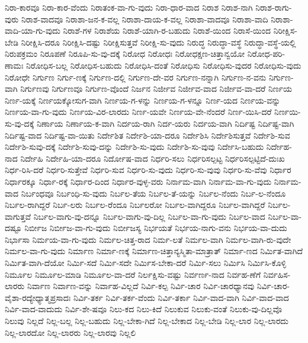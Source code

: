 {ನಿರಾ-ಕಾರವೂ
ನಿರಾ-ಕಾರ-ವೆಂದು
ನಿರಾತಂಕ-ವಾ-ಗು-ವುದು
ನಿರಾ-ಧಾರ-ವಾದ
ನಿರಾಶ
ನಿರಾಶ-ನಾಗಿ
ನಿರಾಶ-ರಾಗು-ವುರು
ನಿರಾಶ-ವಾದವೂ
ನಿರಾಶಾ-ಜನ-ಕ-ವಲ್ಲ
ನಿರಾಶಾ-ದಾಯ-ಕ-ವಲ್ಲ
ನಿರಾಶಾ-ವಾದವೂ
ನಿರಾಶಾ-ವಾದಿ
ನಿರಾಶಾ-ವಾದಿ-ಯಾ-ಗು-ವುದು
ನಿರಾಶೆ-ಗಳ
ನಿರಾಶೆಯ
ನಿರಾಶೆ-ಯಾಗಿ-ರ-ಬಹುದು
ನಿರಾಶೆ-ಯಿಂದ
ನಿರಾಸೆ-ಯಿಂದ
ನಿರೀಕ್ಷಿಸ-ಬೇಡಿ
ನಿರೀಕ್ಷಿಸಿ-ದರೂ
ನಿರೀಕ್ಷಿಸಿ-ದಷ್ಟು
ನಿರೀಕ್ಷಿಸುತ್ತವೆ
ನಿರೀಕ್ಷಿ-ಸು-ವುದು
ನಿರುದ್ಧ
ನಿರುದ್ಧಾ-ವಸ್ಥೆ
ನಿರುದ್ಧಾ-ವಸ್ಥೆ-ಯಲ್ಲಿ
ನಿರುಪಕ್ರಮಂ
ನಿರೂಪಣೆ
ನಿರೂಪಿ-ಸು-ವು-ದಕ್ಕೆ
ನಿರೋಧ
ನಿರೋಧಃ
ನಿರೋಧಕ್ಷಣ-ಚಿತ್ತಾನ್ವಯೋ
ನಿರೋಧ-ಪರಿ-ಣಾಮಃ
ನಿರೋಧಿಸ-ಬಲ್ಲ
ನಿರೋಧಿಸ-ಬಹುದು
ನಿರೋಧಿಸಿ-ದಂತೆ
ನಿರೋಧಿಸು
ನಿರೋಧಿಸು-ವುದರ
ನಿರೋಧಿಸು-ವುದು
ನಿರೋಧೇ
ನಿರ್ಗುಣ
ನಿರ್ಗು-ಣಕ್ಕೆ
ನಿರ್ಗುಣ-ದಲ್ಲಿ
ನಿರ್ಗುಣ-ದೇ-ವರ
ನಿರ್ಗುಣ-ನನ್ನಾಗಿ
ನಿರ್ಗುಣ-ನ-ವನು
ನಿರ್ಗುಣ-ವಾಗಿ
ನಿರ್ಗುಣವು
ನಿರ್ಗುಣವೂ
ನಿರ್ಗುಣ-ವೊಂದೆ
ನಿರ್ಜನ
ನಿರ್ಜೀವ
ನಿರ್ಜೀವ-ವಾದ
ನಿರ್ಜೀವ-ವಾ-ದರೆ
ನಿರ್ಣಯ
ನಿರ್ಣ-ಯಕ್ಕೆ
ನಿರ್ಣಯಕ್ಕೋಸುಗ-ವಾಗಿ
ನಿರ್ಣಯ-ಗ-ಳನ್ನು
ನಿರ್ಣಯ-ಗ-ಳನ್ನೂ
ನಿರ್ಣ-ಯದ
ನಿರ್ಣಯ-ವನ್ನು
ನಿರ್ಣಯ-ವಾ-ಗು-ವುದು
ನಿರ್ಣಯ-ವಿರ-ಲಾರದು
ನಿರ್ಣ-ಯವೇ
ನಿರ್ಣಯ-ವೇ-ನೆಂದರೆ
ನಿರ್ಣ-ಯಿಸಿ-ದರೆ
ನಿರ್ಣಯಿ-ಸು-ವು-ದಕ್ಕೆ
ನಿರ್ಣಾಯ
ನಿರ್ಣಾಯ-ಕ-ವಾಗಿ
ನಿರ್ದಯ-ರಾಗಿ
ನಿರ್ದ-ಯರು
ನಿರ್ದಯ-ವಾಗಿ
ನಿರ್ದಿಷ್ಟ
ನಿರ್ದಿಷ್ಟ-ವಾಗಿ
ನಿರ್ದಿಷ್ಟ-ವಾದ
ನಿರ್ದಿಷ್ಟ-ವಾ-ಯಿತು
ನಿರ್ದೇಶಿತ
ನಿರ್ದೇಶಿ-ಯಾ-ದರೂ
ನಿರ್ದೇಶಿಸಿ
ನಿರ್ದೇಶಿಸುತ್ತವೆ
ನಿರ್ದೇಶಿ-ಸುವ
ನಿರ್ದೇಶಿ-ಸುವು-ದಕ್ಕೆ
ನಿರ್ದೇಶಿ-ಸುವು-ದನ್ನು
ನಿರ್ದೇಶಿ-ಸು-ವುದು
ನಿರ್ದೇಶಿ-ಸು-ವುವು
ನಿರ್ದೇಸಿ-ಬಹುದು
ನಿರ್ದೇಹ-ನಾದ
ನಿರ್ದೇಹಿ
ನಿರ್ದೇಹಿ-ಯಾ-ದರೂ
ನಿರ್ದೋಷ-ವಾದ
ನಿರ್ಧರಿ-ಸಲು
ನಿರ್ಧರಿಸಲ್ಪಟ್ಟ
ನಿರ್ಧರಿಸಲ್ಪಟ್ಟಿದೆ-ದುಃಖ
ನಿರ್ಧ-ರಿಸಿ-ದರೆ
ನಿರ್ಧರಿ-ಸುತ್ತೇವೆ
ನಿರ್ಧರಿ-ಸುವ
ನಿರ್ಧರಿ-ಸು-ವುದು
ನಿರ್ಧರಿ-ಸು-ವುವು
ನಿರ್ಧರಿ-ಸು-ವೆವು
ನಿರ್ಧಾರ
ನಿರ್ಧಾರಕ್ಕೂ
ನಿರ್ಧಾ-ರಕ್ಕೆ
ನಿರ್ಧಾರ-ದಿಂದ
ನಿರ್ಧಾರ-ವುಳ್ಳ-ವರು
ನಿರ್ನಾಮ-ವಾಗಿ
ನಿರ್ನಾಮ-ವಾ-ಗು-ವುದು
ನಿರ್ನಾಮ-ವಾದ
ನಿರ್ಬಂಧವೂ
ನಿರ್ಬಂಧಿ-ಸು-ವುದು
ನಿರ್ಬಲ-ತೆಯ
ನಿರ್ಬಲ-ತೆ-ಯನ್ನು
ನಿರ್ಬಲ-ನೆಂದು
ನಿರ್ಬ-ಲ-ನೆಂದೂ
ನಿರ್ಬಲ-ರಾಗಿದ್ದರೆ
ನಿರ್ಬ-ಲರು
ನಿರ್ಬಲ-ರೆಂದೂ
ನಿರ್ಬಲರೋ
ನಿರ್ಬಲ-ವಾಗಿದ್ದರೂ
ನಿರ್ಬಲ-ವಾಗಿದ್ದರೆ
ನಿರ್ಬಲ-ವಾಗುತ್ತವೆ
ನಿರ್ಬಲ-ವಾಗು-ವು-ದನ್ನೂ
ನಿರ್ಬಲ-ವಾಗು-ವು-ದಿಲ್ಲ
ನಿರ್ಬಲ-ವಾ-ಗು-ವುದು
ನಿರ್ಬಲ-ವಾದ
ನಿರ್ಬಲ-ವಾ-ದಷ್ಟೂ
ನಿರ್ಬೀಜ
ನಿರ್ಬೀಜ-ವಾ-ಗು-ವುದು
ನಿರ್ಬೀಜಸ್ಯ
ನಿರ್ಭಯತೆ
ನಿರ್ಭಯ-ನಾಗು-ವನು
ನಿರ್ಭಯ-ವಾ-ದುದು
ನಿರ್ಭಾಸಾ
ನಿರ್ಮಯ-ವಾ-ಗು-ವುದು
ನಿರ್ಮಲ-ಚಿತ್ತ-ರಾದ
ನಿರ್ಮ-ಲತೆ
ನಿರ್ಮಲ-ವಾಗಿ
ನಿರ್ಮಲ-ವಾಗಿ-ರು-ವುದೇ
ನಿರ್ಮಲ-ವಾ-ಗು-ವುದು
ನಿರ್ಮಾಣ
ನಿರ್ಮಾ-ಣಕ್ಕೆ
ನಿರ್ಮಾಣ-ಚಿತ್ತಾನ್ಯಸ್ಮಿತಾ-ಮಾತ್ರಾತ್
ನಿರ್ಮಾ-ಣದ
ನಿರ್ಮಿತ-ವಾಗಿದೆ
ನಿರ್ಮಿತ-ವಾಗಿ-ದೆಯೋ
ನಿರ್ಮಿ-ಸದೆ
ನಿರ್ಮಿ-ಸದೇ
ನಿರ್ಮಿಸ-ಬೇಕಾ-ದರೆ
ನಿರ್ಮಿ-ಸಲು
ನಿರ್ಮಿಸಿ
ನಿರ್ಮಿಸಿ-ಕೊಳ್ಳಿ
ನಿರ್ಮೂಲ
ನಿರ್ಮೂಲ-ಮಾಡಿ
ನಿರ್ಮೂಲ-ವಾ-ದರೆ
ನಿರ್ಲಕ್ಷಿಸು-ವಷ್ಟು
ನಿರ್ವರ್ಣ-ನಾದ
ನಿರ್ವಹ-ಣೆಗೆ
ನಿರ್ವಹಿಸ-ಲಾರರು
ನಿರ್ವಾಣ
ನಿರ್ವಾಣ-ವನ್ನು
ನಿರ್ವಾಹ-ವಿಲ್ಲದೆ
ನಿರ್ವಿ-ಕಲ್ಪ
ನಿರ್ವಿ-ಚಾರ
ನಿರ್ವಿ-ಚಾರಧ್ಯಾನವು
ನಿರ್ವಿ-ಚಾರ-ವೈಶಾ-ರದ್ಯೇಧ್ಯಾತ್ಮಪ್ರಸಾದಃ
ನಿರ್ವಿ-ತರ್ಕ
ನಿರ್ವಿ-ತರ್ಕ-ವೆಂದು
ನಿರ್ವಿ-ತರ್ಕಾ
ನಿರ್ವಿ-ವಾದ-ವಾಗಿ
ನಿರ್ವಿ-ವಾದ-ವಾದ
ನಿರ್ವಿ-ವಾದ-ವಾದುದು
ನಿರ್ವಿ-ಶೇ-ಷವೂ
ನಿಲು-ಕದ
ನಿಲು-ಕಿದೆ
ನಿಲುಕುವ
ನಿಲುಕು-ವಂತೆ
ನಿಲುಕು-ವು-ದಿಲ್ಲವೊ
ನಿಲುವು
ನಿಲ್ಲದೆ
ನಿಲ್ಲ-ಬಲ್ಲ
ನಿಲ್ಲ-ಬಹುದು
ನಿಲ್ಲ-ಬೇಕಾ-ಗಿದೆ
ನಿಲ್ಲ-ಬೇಕಾದ
ನಿಲ್ಲ-ಬೇಡಿ
ನಿಲ್ಲ-ಲಾರ
ನಿಲ್ಲ-ಲಾರದು
ನಿಲ್ಲ-ಲಾರದೋ
ನಿಲ್ಲ-ಲಾರರು
ನಿಲ್ಲ-ಲಾರವು
ನಿಲ್ಲಲಿ
}
